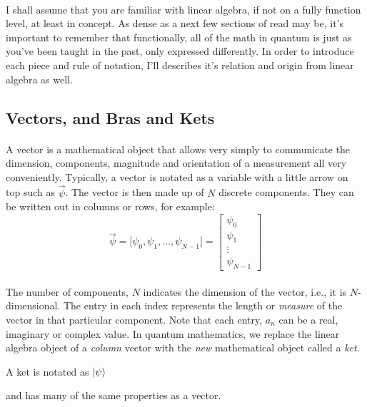 \documentclass[12pt,letterpaper]{book}
\begin{document}
\paragraph*{}I shall assume that you are familiar with linear algebra, if not on a fully function level, at least in concept. As dense as a next few sections of read may be, it's important to remember that functionally, all of the math in quantum is just as you've been taught in the past, only expressed differently. In order to introduce each piece and rule of notation, I'll describes it's relation and origin from linear algebra as well.


\subsection*{Vectors, and Bras and Kets}
\paragraph*{}A vector is a mathematical object that allows very simply to communicate the dimension, components, magnitude and orientation of a measurement all very conveniently. Typically, a vector is notated as a variable with a little arrow on top such as $\vec{\psi}$. The vector is then made up of $N$ discrete components. They can be written out in columns or rows, for example:
\begin{equation}
\label{vector}
\vec{\psi} = \big[ \psi_0 , \psi_1 , \hdots , \psi_{N-1} ] =
\begin{bmatrix}
\psi_0 \\ \psi_1  \\ \vdots \\ \psi_{N-1}
\end{bmatrix}
\end{equation}
\paragraph*{}The number of components, $N$ indicates the dimension of the vector, i.e., it is $N$-dimensional. The entry in each index represents the length or \textit{measure} of the vector in that particular component. Note that each entry, $a_n$ can be a real, imaginary or complex value. In quantum mathematics, we replace the linear algebra object of a \textit{column} vector with the \textit{new} mathematical object called a \textit{ket}.
\begin{center}
A ket is notated as $\ket{\psi}$ 
\end{center} 
and has many of the same properties as a vector.
\end{document}
